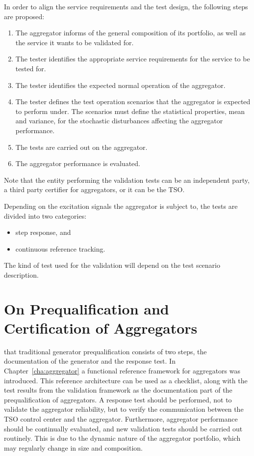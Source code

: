 In order to align the service requirements and the test design, the following steps are proposed:
\begin{enumerate}
	\item The aggregator informs of the general composition of its portfolio, as well as the service it wants to be validated for.
	\item The tester identifies the appropriate service requirements for the service to be tested for.
	\item The tester identifies the expected normal operation of the aggregator.
	\item The tester defines the test operation scenarios that the aggregator is expected to perform under. The scenarios must define the statistical properties, \eg mean and variance, for the stochastic disturbances affecting the aggregator performance.
	\item The tests are carried out on the aggregator.
	\item The aggregator performance is evaluated.	
\end{enumerate}

Note that the entity performing the validation tests can be an independent party, \eg a third party certifier for aggregators, or it can be the TSO.

Depending on the excitation signals the aggregator is subject to, the tests are divided into two categories:
\begin{itemize}
	\item step response, and
	\item continuous reference tracking.
\end{itemize}
The kind of test used for the validation will depend on the test scenario description.

\section{On Prequalification and Certification of Aggregators}\label{sec:aggpreq}
 that traditional generator prequalification consists of two steps, the documentation of the generator and the response test. In Chapter~\ref{cha:aggregator} a functional reference framework for aggregators was introduced. This reference architecture can be used as a checklist, along with the test results from the validation framework as the documentation part of the prequalification of aggregators. A response test should be performed, not to validate the aggregator reliability, but to verify the communication between the TSO control center and the aggregator. Furthermore, aggregator performance should be continually evaluated, and new validation tests should be carried out routinely. This is due to the dynamic nature of the aggregator portfolio, which may regularly change in size and composition.

